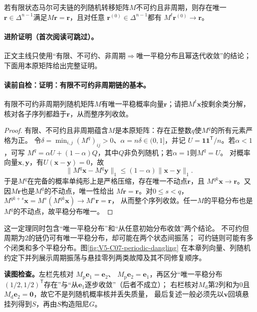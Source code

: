 \label{struct:V5-C07-CH12}
\begin{theorem}\label{thm:V5-C07-basic-convergence}
若有限状态马尔可夫链的列随机转移矩阵$M$不可约且非周期，则存在唯一
$\boldsymbol r\in\Delta^{n-1}$满足$M\boldsymbol r=\boldsymbol r$，且对任意
$\boldsymbol r^{(0)}\in\Delta^{n-1}$都有
$M^t\boldsymbol r^{(0)}\to\boldsymbol r$。
\end{theorem}
\label{struct:V5-C07-CH13}
\paragraph{进阶证明（首次阅读可跳过）。}
正文主线只使用“有限、不可约、非周期$\Rightarrow$唯一平稳分布且幂迭代收敛”的结论；下面用本原矩阵给出完整证明。
\paragraph{读前自检：证明：有限不可约非周期链的基本。}有限不可约非周期列随机矩阵$M$有唯一平稳概率向量$\boldsymbol r$；请把$M^t\boldsymbol x$按剩余类分解，核对各子序列都趋于$\boldsymbol r$，从而整序列收敛。\par

\begin{proof}
有限、不可约且非周期蕴含$M$是本原矩阵：存在正整数$q$使$M^q$的所有元素严格为正。
令$\delta=\min_{i,j}(M^q)_{ij}>0$、$\alpha=n\delta\in(0,1]$，并记
$U=\boldsymbol1\boldsymbol1^{\mathsf T}/n$。若$\alpha<1$，可写
$M^q=\alpha U+(1-\alpha)Q$，其中$Q$非负列随机；若$\alpha=1$则$M^q=U$。
对概率向量$\boldsymbol x,\boldsymbol y$，有$U(\boldsymbol x-\boldsymbol y)=0$，故
\[
\|M^q\boldsymbol x-M^q\boldsymbol y\|_1
\le(1-\alpha)\|\boldsymbol x-\boldsymbol y\|_1.
\]
于是$M^q$在完备的概率单纯形上是严格压缩，存在唯一不动点$\boldsymbol r$，且
$M^{qk}\boldsymbol x\to\boldsymbol r$。又因$M\boldsymbol r$也是$M^q$的不动点，唯一性给出
$M\boldsymbol r=\boldsymbol r$。对$0\le s<q$，
$M^{qk+s}\boldsymbol x=M^s(M^{qk}\boldsymbol x)\to M^s\boldsymbol r=\boldsymbol r$，
从而整个序列收敛。任一$M$的平稳分布也是$M^q$的不动点，故平稳分布唯一。
\end{proof}

这一定理同时包含“唯一平稳分布”和“从任意初始分布收敛”两个结论。
不可约但周期为$2$的链仍可有唯一平稳分布，却可能在两个状态间振荡；
可约链则可能有多个闭类和多个平稳分布。图\ref{fig:V5-C07-periodic-dangling}
在本章列向量、列随机约定下并列展示周期振荡与悬挂零列两类故障及其不同修复顺序。

\FloatBarrier
\noindent\textbf{读图检查。}左栏先核对
$M_{\mathrm p}\boldsymbol e_1=\boldsymbol e_2$、
$M_{\mathrm p}\boldsymbol e_2=\boldsymbol e_1$，再区分“唯一平稳分布
$(1/2,1/2)^{\mathsf T}$存在”与“从$\boldsymbol e_1$逐步收敛”（后者不成立）；
右栏核对$M_{\mathrm d}$第$2$列和为$0$且
$M_{\mathrm d}\boldsymbol e_2=\boldsymbol0$，故它不是列随机概率核并丢失质量，
最后复述一般\PageRank{}必须先以$\boldsymbol v$回填悬挂列得到$S$，再由$S$构造阻尼$G$。

